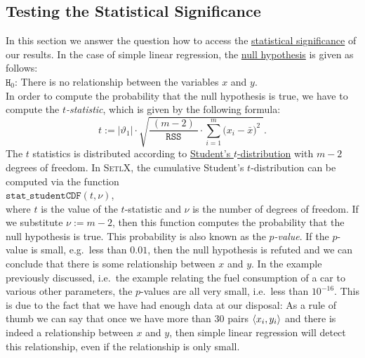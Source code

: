 \subsection{Testing the Statistical Significance}
In this section we answer the question how to access the 
\href{https://en.wikipedia.org/wiki/Statistical_significance}{statistical significance} of our
results.  In the case of simple linear regression, the
\href{https://en.wikipedia.org/wiki/Null_hypothesis}{null hypothesis} is given as follows: 
\\[0.2cm]
\hspace*{1.3cm}
$\mathtt{H}_0$: There is no relationship between the variables $x$ and $y$.
\\[0.2cm]
In order to compute the probability that the null hypothesis is true, we have to compute the
\emph{\color{blue} $t$-statistic}, which is given by the following formula:
\begin{equation}
  \label{eq:t-statistics}
  t := |\vartheta_1| \cdot \sqrt{\frac{\;(m-2)\;}{\mathtt{RSS}} \cdot \sum\limits_{i=1}^m \bigl(x_i - \bar{x}\bigr)^2\; }.
\end{equation}
The $t$ statistics is distributed according to 
\href{https://en.wikipedia.org/wiki/Student%27s_t-distribution}{Student's $t$-distribution} 
with $m-2$ degrees of freedom.  In \textsc{SetlX}, the cumulative Student's $t$-distribution can be computed
via the function
\\[0.2cm]
\hspace*{1.3cm}
$\mathtt{stat\_studentCDF}(t, \nu)$,
\\[0.2cm]
where $t$ is the value of the $t$-statistic and $\nu$ is the number of degrees of freedom.  If we substitute
$\nu := m - 2$, then this function computes the probability that the null hypothesis is true.  This probability
is also known as the \emph{$p$-value}.  If the $p$-value is small, e.g.~less than $0.01$, then the null
hypothesis is refuted and we can conclude that there is some relationship between $x$ and $y$.  In the example
previously discussed, i.e.~the example relating the fuel consumption of a car to various other parameters, the
$p$-values are all very small, i.e.~less than $10^{-16}$.  This is due to the fact that we have had enough data at
our disposal:  As a rule of thumb we can say that once we have more than 30 pairs $\pair(x_i, y_i)$ and there
is indeed a relationship between $x$ and $y$, then simple linear regression will detect this relationship, even
if the relationship is only small. 

